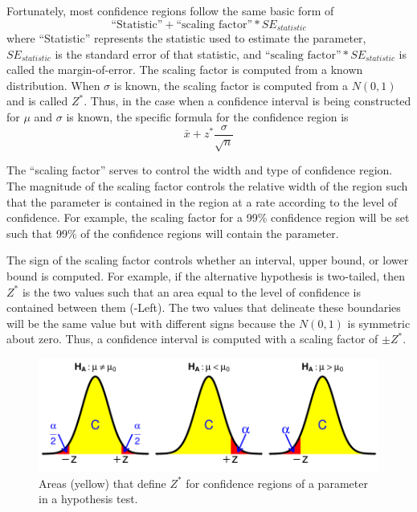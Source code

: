 \documentclass[10pt,openany]{book}\usepackage[]{graphicx}\usepackage[]{color}
\newenvironment{knitrout}{}{} %
\begin{document}
Fortunately, most confidence regions follow the same basic form of
  \[ \text{``Statistic''} + \text{``scaling factor''} * SE_{statistic} \]
where ``Statistic'' represents the statistic used to estimate the parameter, $SE_{statistic}$ is the standard error of that statistic, and $\text{``scaling factor''}*SE_{statistic}$ is called the margin-of-error. The scaling factor is computed from a known distribution. When $\sigma$ is known, the scaling factor is computed from a $N(0,1)$ and is called $Z^{*}$. Thus, in the case when a confidence interval is being constructed for $\mu$ and $\sigma$ is known, the specific formula for the confidence region is
  \[ \bar{x} + z^{*}\frac{\sigma}{\sqrt{n}} \]

The ``scaling factor'' serves to control the width and type of confidence region. The magnitude of the scaling factor controls the relative width of the region such that the parameter is contained in the region at a rate according to the level of confidence.  For example, the scaling factor for a 99\% confidence region will be set such that 99\% of the confidence regions will contain the parameter.

The sign of the scaling factor controls whether an interval, upper bound, or lower bound is computed.  For example, if the alternative hypothesis is two-tailed, then $Z^{*}$ is the two values such that an area equal to the level of confidence is contained between them (-Left).  The two values that delineate these boundaries will be the same value but with different signs because the $N(0,1)$ is symmetric about zero.  Thus, a confidence interval is computed with a scaling factor of $\pm Z^{*}$.

\begin{knitrout}
\color{fgcolor}\begin{figure}[hbtp]

{\centering \includegraphics[width=.8\linewidth]{Figs/CIboundsZ-1} 

}

\caption[Areas (yellow) that define $Z^{*}$ for confidence regions of a parameter in a hypothesis test]{Areas (yellow) that define $Z^{*}$ for confidence regions of a parameter in a hypothesis test.}\label{fig:CIboundsZ}
\end{figure}


\end{knitrout}
\end{document}
